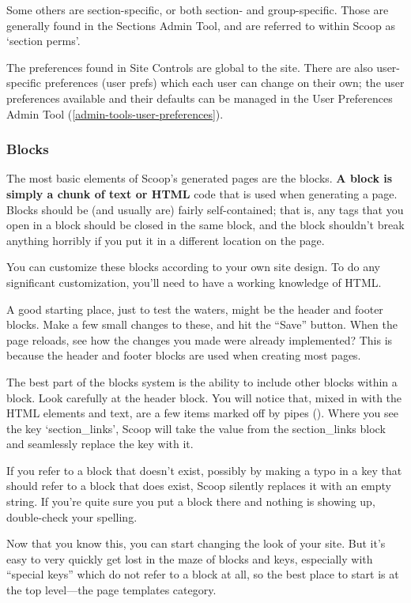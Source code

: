 Some others are section-specific, or both section- and group-specific.  Those are generally found in the Sections Admin Tool, and are referred to within Scoop as `section perms'.

The preferences found in Site Controls are global to the site. There are also user-specific preferences (user prefs) which each user can change on their own; the user preferences available and their defaults can be managed in the User Preferences Admin Tool (\ref{admin-tools-user-preferences}).

\subsubsection{Blocks}
\label{how-blocks}

The most basic elements of Scoop's generated pages are the blocks.  {\bf A block is simply a chunk of text or HTML} code that is used when generating a page.  Blocks should be (and usually are) fairly self-contained; that is, any tags that you open in a block should be closed in the same block, and the block shouldn't break anything horribly if you put it in a different location on the page.

You can customize these blocks according to your own site design.  To do any significant customization, you'll need to have a working knowledge of HTML.

A good starting place, just to test the waters, might be the header and footer blocks.  Make a few small changes to these, and hit the ``Save'' button.  When the page reloads, see how the changes you made were already implemented?  This is because the header and footer blocks are used when creating most pages.

The best part of the blocks system is the ability to include other blocks within a block.  Look carefully at the header block.  You will notice that, mixed in with the HTML elements and text, are a few items marked off by pipes (\latexhtml{$\vert$}{|}).  Where you see the key `\latexhtml{$\vert$}{|}section\_links\latexhtml{$\vert$}{|}', Scoop will take the value from the section\_links block and seamlessly replace the key with it.

If you refer to a block that doesn't exist, possibly by making a typo in a key that should refer to a block that does exist, Scoop silently replaces it with an empty string.  If you're quite sure you put a block there and nothing is showing up, double-check your spelling.

Now that you know this, you can start changing the look of your site.  But it's easy to very quickly get lost in the maze of blocks and keys, especially with ``special keys'' which do not refer to a block at all, so the best place to start is at the top level---the page templates category.

